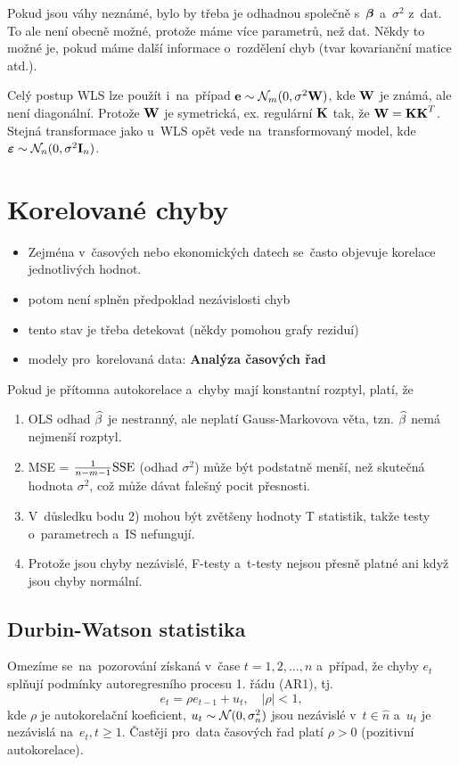 \begin{remark}
Pokud jsou váhy neznámé, bylo by třeba je odhadnou společně s~$\boldsymbol{\beta}$ a~$\sigma^2$ z~dat. To ale není obecně možné, protože máme více parametrů, než dat. Někdy to možné je, pokud máme další informace o~rozdělení chyb (tvar kovarianční matice atd.).
\end{remark}

\begin{remark}
	Celý postup WLS lze použít i~na~případ $\mathbf{e} \sim \mathcal{N}_m(0,\sigma^2 \textbf{W})$, kde $\textbf{W}$ je známá, ale není diagonální. Protože $\textbf{W}$ je symetrická, ex. regulární $\textbf{K}$ tak, že $\textbf{W} = \textbf{K} \textbf{K}^T$. Stejná transformace jako u~WLS opět vede na~transformovaný model, kde $\boldsymbol{\varepsilon} \sim \mathcal{N}_n(0,\sigma^2 \textbf{I}_{n})$.
\end{remark}

\section{Korelované chyby}
\begin{itemize}
\item Zejména v~časových nebo ekonomických datech se~často objevuje korelace jednotlivých hodnot.
\item potom není splněn předpoklad nezávislosti chyb
\item tento stav je třeba detekovat (někdy pomohou grafy reziduí)
\item modely pro~korelovaná data: \textbf{Analýza časových řad}
\end{itemize}

Pokud je přítomna autokorelace a~chyby mají konstantní rozptyl, platí, že
\begin{enumerate}
\item OLS odhad $\widehat{\beta}$ je nestranný, ale neplatí Gauss-Markovova věta, tzn. $\widehat{\beta}$ nemá nejmenší rozptyl.
\item MSE = $\frac{1}{n-m-1}\mathrm{SSE}$ (odhad $\sigma^2$) může být podstatně menší, než skutečná hodnota $\sigma^2$, což může dávat falešný pocit přesnosti.
\item V~důsledku bodu 2) mohou být zvětšeny hodnoty T statistik, takže testy o~parametrech a~IS nefungují.
\item Protože jsou chyby nezávislé, F-testy a~t-testy nejsou přesně platné ani když jsou chyby normální.
\end{enumerate}

\subsection{Durbin-Watson statistika}
Omezíme se~na~pozorování získaná v~čase $t = 1,2,\dots, n$ a~případ, že chyby $e_t$ splňují podmínky autoregresního procesu 1. řádu (AR1), tj.
 $$
e_t = \rho e_{t-1}+ u_t, \quad |\rho| < 1,
 $$
kde $\rho$ je autokorelační koeficient, $u_t \sim \mathcal{N} (0, \sigma_n^2)$ jsou nezávislé v~$t  \in\widehat{n} $ a~$u_t$ je nezávislá na~$e_t, t \geq 1$. Častěji pro~data časových řad platí $\rho > 0$ (pozitivní autokorelace).

